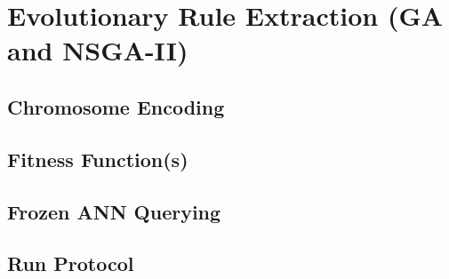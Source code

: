 \documentclass[../main.tex]{subfiles}
\begin{document}
\section{Evolutionary Rule Extraction (GA and NSGA-II)}
\label{sec:method-rule-extraction}


\subsection{Chromosome Encoding}
\label{sec:rule-encoding}

\subsection{Fitness Function(s)}
\label{sec:rule-fitness}

\subsection{Frozen ANN Querying}
\label{sec:rule-ann-querying}

\subsection{Run Protocol}
\label{sec:rule-run-protocol}
\end{document}
